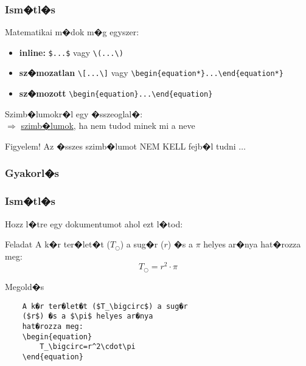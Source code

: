 \documentclass[xcolor=pdftex,dvipsnames,table,compress,bigger]{beamer}
\begin{document}
\begin{frame}[fragile]
    \frametitle{Ism�tl�s}
    Matematikai m�dok m�g egyszer:
    \begin{itemize}[<alert@+>]
    	\item {\bf inline:} \verb*|$...$| vagy \verb*|\(...\)|
    	\item {\bf sz�mozatlan} \verb*|\[...\]| vagy \verb*|\begin{equation*}...\end{equation*}|
    	\item {\bf sz�mozott} \verb*|\begin{equation}...\end{equation}|
    \end{itemize}
    Szimb�lumokr�l egy �sszeoglal�: \\$\Rightarrow$ \href{http://www.ctan.org/tex-archive/info/symbols/comprehensive/symbols-a4.pdf}{szimb�lumok}, ha nem tudod minek mi a neve
    \begin{alertblock}{Figyelem!}
    	Az �sszes szimb�lumot NEM KELL fejb�l tudni $\ldots$
    \end{alertblock}
\end{frame}    

\subsubsection{Gyakorl�s}
\begin{frame}[fragile]
    \frametitle{Ism�tl�s}
    Hozz l�tre egy dokumentumot ahol ezt l�tod:\\ 
    \begin{exampleblock}{Feladat}
    A k�r ter�let�t ($T_\bigcirc$) a sug�r ($r$) �s a $\pi$ helyes ar�nya hat�rozza meg:
    \begin{equation}
    	T_\bigcirc=r^2\cdot\pi
    \end{equation}
    \end{exampleblock}
    \pause
    \begin{block}{Megold�s}
    \begin{verbatim}
    A k�r ter�let�t ($T_\bigcirc$) a sug�r 
    ($r$) �s a $\pi$ helyes ar�nya 
    hat�rozza meg:
    \begin{equation}
    	T_\bigcirc=r^2\cdot\pi 
    \end{equation}
    \end{verbatim}
    \end{block}
\end{frame}
\end{document}
